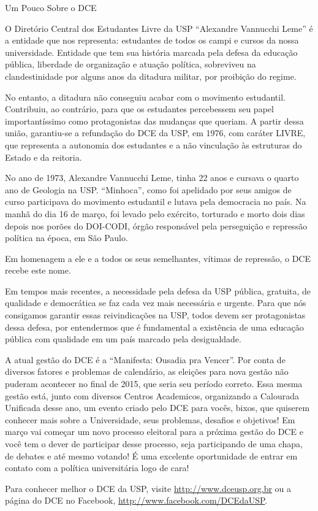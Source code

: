 \begin{secao}{Um Pouco Sobre o DCE}

O Diretório Central dos Estudantes Livre da USP ``Alexandre Vannucchi Leme'' é a
entidade que nos representa: estudantes de todos os campi e cursos da nossa universidade.
Entidade que tem sua história marcada pela defesa da educação pública, liberdade
de organização e atuação política, sobreviveu na clandestinidade por alguns anos
da ditadura militar, por proibição do regime.

No entanto, a ditadura não conseguiu acabar com o movimento estudantil. Contribuiu,
ao contrário, para que os estudantes percebessem seu papel importantíssimo como
protagonistas das mudanças que queriam. A partir dessa união, garantiu-se a
refundação do DCE da USP, em 1976, com caráter LIVRE, que representa a autonomia
dos estudantes e a não vinculação às estruturas do Estado e da reitoria.

No ano de 1973, Alexandre Vannucchi Leme, tinha 22 anos e cursava o quarto ano
de Geologia na USP. ``Minhoca'', como foi apelidado por seus amigos de curso participava
do movimento estudantil e lutava pela democracia no país. Na manhã do dia 16 de março,
foi levado pelo exército, torturado e morto dois dias depois nos porões do DOI-CODI,
órgão responsável pela perseguição e repressão política na época, em São Paulo.

Em homenagem a ele e a todos os seus semelhantes, vítimas de repressão, o DCE recebe este nome.

Em tempos mais recentes, a necessidade pela defesa da USP pública, gratuita, de qualidade
e democrática se faz cada vez mais necessária e urgente. Para que nós consigamos
garantir essas reivindicações na USP, todos devem ser protagonistas dessa defesa,
por entendermos que é fundamental a existência de uma educação pública com qualidade
em um país marcado pela desigualdade.

A atual gestão do DCE é a “Manifesta: Ousadia pra Vencer”. Por conta de diversos fatores e 
problemas de calendário, as eleições para nova gestão não puderam acontecer no final de 2015, 
que seria seu período correto. Essa mesma gestão está, junto com diversos Centros Academicos, 
organizando a Calourada Unificada desse ano, um evento criado pelo DCE para vocês, bixos, 
que quiserem conhecer mais sobre a Universidade, seus problemas, desafios e objetivos! Em 
março vai começar um novo processo eleitoral para a próxima gestão do DCE e você tem o dever 
de participar desse processo, seja participando de uma chapa, de debates e até mesmo votando! 
É uma excelente oportunidade de entrar em contato com a política universitária logo de cara!

Para conhecer melhor o DCE da USP, visite \url{http://www.dceusp.org.br} ou a página do DCE no Facebook,
\url{http://www.facebook.com/DCEdaUSP}.

\end{secao}
